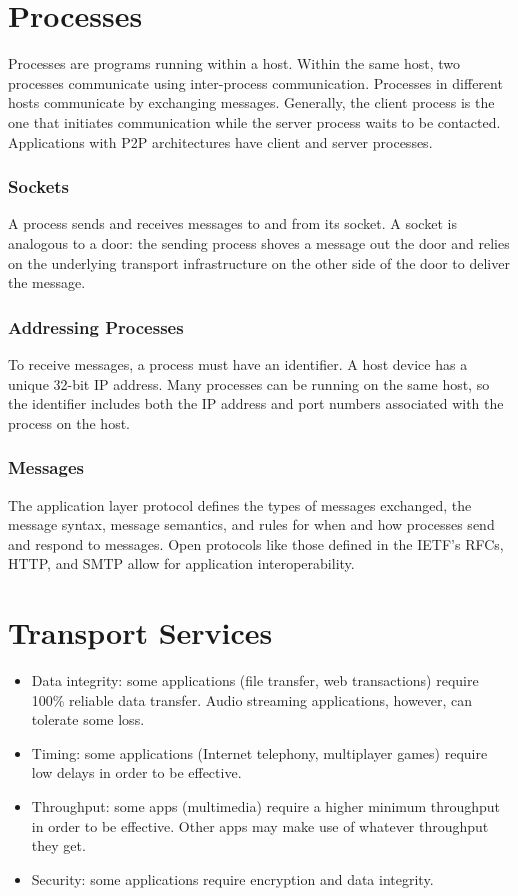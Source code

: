 \documentclass{math}
\begin{document}
\section*{Processes}
Processes are programs running within a host. Within the same host, two
processes communicate using inter-process communication. Processes in
different hosts communicate by exchanging messages. Generally, the client
process is the one that initiates communication while the server process waits
to be contacted. Applications with P2P architectures have client and server
processes.

\subsubsection*{Sockets}
A process sends and receives messages to and from its socket. A socket is
analogous to a door: the sending process shoves a message out the door and
relies on the underlying transport infrastructure on the other side of the
door to deliver the message.

\subsubsection*{Addressing Processes}
To receive messages, a process must have an identifier. A host device has a
unique 32-bit IP address. Many processes can be running on the same host, so
the identifier includes both the IP address and port numbers associated with
the process on the host.

\subsubsection*{Messages}
The application layer protocol defines the types of messages exchanged, the
message syntax, message semantics, and rules for when and how processes send
and respond to messages. Open protocols like those defined in the IETF's
RFCs, HTTP, and SMTP allow for application interoperability.

\section*{Transport Services}
\begin{itemize}
  \item Data integrity: some applications (file transfer, web transactions)
  require 100\% reliable data transfer. Audio streaming applications, however,
  can tolerate some loss.
  \item Timing: some applications (Internet telephony, multiplayer games)
  require low delays in order to be effective.
  \item Throughput: some apps (multimedia) require a higher minimum throughput
  in order to be effective. Other apps may make use of whatever throughput they
  get.
  \item Security: some applications require encryption and data integrity.
\end{itemize}
\end{document}
